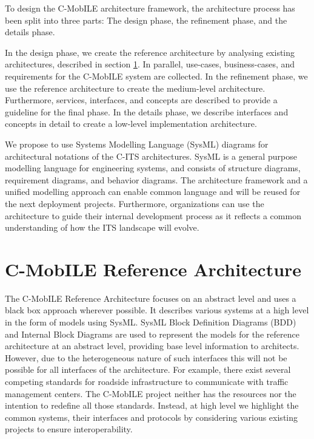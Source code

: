 \documentclass[conference]{IEEEtran}
\begin{document}
To design the C-MobILE architecture framework, the architecture process has been split into three parts:
The design phase, the refinement phase, and the details phase.

In the design phase, we create the reference architecture by analysing existing architectures, described in section \ref{secCMobILEReferenceArchitecture}.
In parallel, use-cases, business-cases, and requirements for the C-MobILE system are collected.
In the refinement phase, we use the reference architecture to create the medium-level architecture.
Furthermore, services, interfaces, and concepts are described to provide a guideline for the final phase.
In the details phase, we describe interfaces and concepts in detail to create a low-level implementation architecture.

We propose to use Systems Modelling Language (SysML) diagrams for architectural notations of the C-ITS architectures.
SysML is a general purpose modelling language for engineering systems, and consists of structure diagrams, requirement diagrams, and behavior diagrams.
The architecture framework and a unified modelling approach can enable common language and will be reused for the next deployment projects.
Furthermore, organizations can use the architecture to guide their internal development process as it reflects a common understanding of how the ITS landscape will evolve.


\section{C-MobILE Reference Architecture}
\label{secCMobILEReferenceArchitecture}

The C-MobILE Reference Architecture focuses on an abstract level and uses a black box approach wherever possible.
It describes various systems at a high level in the form of models using SysML.
SysML Block Definition Diagrams (BDD) and Internal Block Diagrams are used to represent the models for the reference architecture at an abstract level, providing base level information to architects.
However, due to the heterogeneous nature of such interfaces this will not be possible for all interfaces of the architecture.
For example, there exist several competing standards for roadside infrastructure to communicate with traffic management centers.
The C-MobILE project neither has the resources nor the intention to redefine all those standards.
Instead, at high level we highlight the common systems, their interfaces and protocols by considering various existing projects to ensure interoperability.
\end{document}
